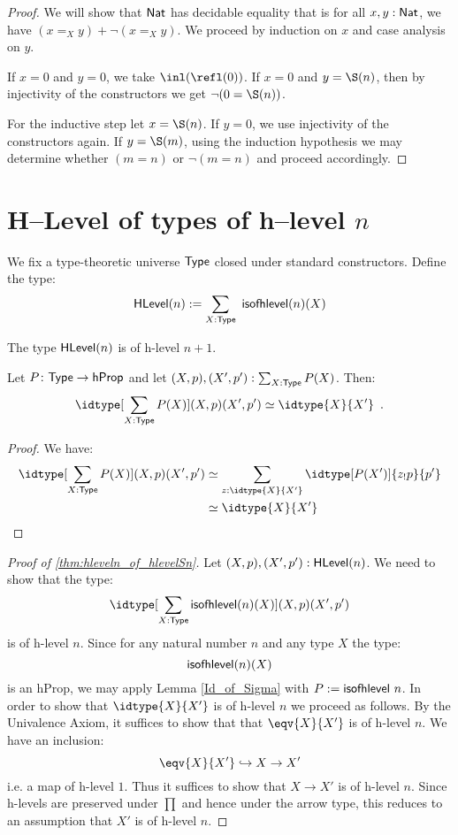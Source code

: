 \begin{proof}
 We will show that $\mathsf{Nat}$ has decidable equality that is for all $x, y : \mathsf{Nat}$, we have $(x =_X y) + \neg (x =_X y)$. 
 We proceed by induction on $x$ and case analysis on $y$.
 
 If $x = 0$ and $y = 0$, we take $\inl(\refl(0))$. If $x = 0$ and $y = \S(n)$, 
 then by injectivity of the constructors we get $\neg (0 = \S (n))$.
 
 For the inductive step let $x = \S (n)$. If $y = 0$, we use injectivity of the constructors again. 
 If $y = \S (m)$, using the induction hypothesis we may determine whether $(m = n)$ or $\neg(m = n)$ and proceed accordingly.
\end{proof}

\section{H--Level of types of h--level $n$}

We fix a type-theoretic universe $\mathsf{Type}$ closed under standard constructors. Define the type:
 \[\mathsf{HLevel}(n) := \sum_{X : \mathsf{Type}} \ \mathsf{isofhlevel}(n)(X) \]

\begin{thm}\label{thm:hleveln_of_hlevelSn}
 The type $\mathsf{HLevel}(n)$ is of h-level $n+1$.
\end{thm}

\begin{lem}\label{Id_of_Sigma}
 Let $P \colon \mathsf{Type} \to \mathsf{hProp}$ and let $(X, p), (X', p') : \sum_{X : \mathsf{Type}} P(X)$. Then:
 \[ \idtype[\sum_{X : \Type} P(X)]{(X, p)}{(X', p')} \simeq \idtype{X}{X'} \enspace .\]
\end{lem}

\begin{proof}
 We have:
 \begin{equation*}\begin{split}
  \idtype[\sum_{X : \Type} P(X)]{(X, p)}{(X', p')} & \simeq \sum_{z : \idtype{X}{X'}} \idtype[P(X')]{z_!p}{p'} \\
  & \simeq \idtype{X}{X'}
 \end{split}
 \end{equation*}
\end{proof}

\begin{proof}[Proof of \autoref{thm:hleveln_of_hlevelSn}]
 Let $(X, p), (X', p') : \mathsf{HLevel}(n)$. We need to show that the type:
 \[ \idtype[\sum_{X : \Type} \isofhlevel(n)(X)] {(X, p)}{(X', p')} \]
 is of h-level $n$. Since for any natural number $n$ and any type $X$ the type:
 \[\mathsf{isofhlevel}(n)(X) \]
 is an hProp, we may apply Lemma \ref{Id_of_Sigma} with $P := \mathsf{isofhlevel} \ n$. 
In order to show that $\idtype{X}{X'}$ is of h-level $n$ we proceed as follows. 
By the Univalence Axiom, it suffices to show that that $\eqv{X}{X'}$ is of h-level $n$. We have an inclusion:
 \[\eqv{X}{X'} \hookrightarrow X \rightarrow X'\]
 i.e. a map of h-level $1$. Thus it suffices to show that $X \rightarrow X'$ is of h-level $n$. 
Since h-levels are preserved under $\prod$ and hence under the arrow type, this reduces to an assumption that $X'$ is of h-level $n$.
\end{proof}